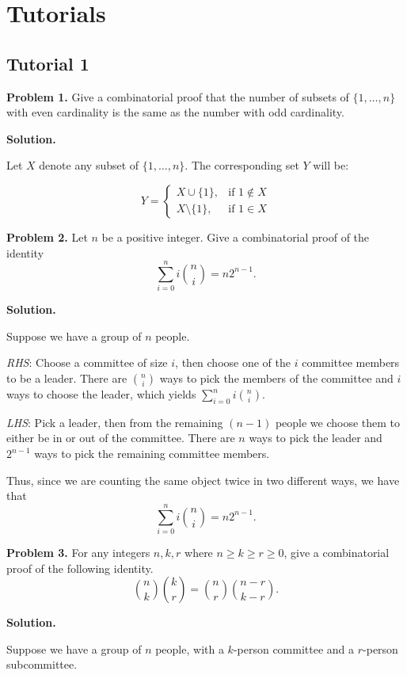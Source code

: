 \chapter{Tutorials}

\section{Tutorial 1}
\textbf{Problem 1.} Give a combinatorial proof that the number of
subsets of $ \{1,\ldots ,n\} $ with even cardinality is the same as the
number with odd cardinality.

\textbf{Solution.}

Let $ X $ denote any subset of $ \{1,\ldots ,n\} $. The corresponding
set $ Y $ will be:

\[ Y = \begin{cases}
    X\cup \{1\}, & \text{if } 1\notin X\\
    X\setminus \{1\}, & \text{if } 1\in X
\end{cases} \]

\textbf{Problem 2.} Let $ n $ be a positive integer. Give a combinatorial proof
of the identity
\[ \sum\limits_{i=0}^{n} i \binom{n}{i} = n2^{n-1}. \]

\textbf{Solution.}

Suppose we have a group of $ n $ people.

\emph{RHS}: Choose a committee of size $ i $, then choose one of
the $ i $ committee members to be a leader. There are $ \binom{n}{i} $
ways to pick the members of the committee and $ i $ ways to choose the leader,
which yields $ \sum\limits_{i=0}^{n} i\binom{n}{i} $.

\emph{LHS}: Pick a leader, then from the remaining $ (n-1) $ people
we choose them to either be in or out of the committee. There are
$ n $ ways to pick the leader and $ 2^{n-1} $ ways to pick
the remaining committee members.

Thus, since we are counting the same object twice in two different ways,
we have that
\[ \sum\limits_{i=0}^{n} i \binom{n}{i} = n2^{n-1}. \]

\textbf{Problem 3.} For any integers $ n,k,r $ where
$ n\geqslant k \geqslant r\geqslant 0 $, give a combinatorial proof
of the following identity.
\[ \binom{n}{k}\binom{k}{r}=\binom{n}{r}\binom{n-r}{k-r}. \]

\textbf{Solution.}

Suppose we have a group of $ n $ people, with a $ k $-person
committee and a $ r $-person subcommittee.

